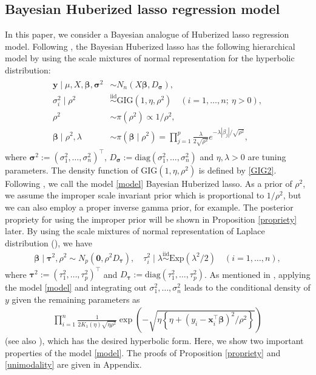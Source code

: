 \documentclass[11pt]{article}
\theoremstyle{plain}
\theoremstyle{definition}
\begin{document}
\subsection{Bayesian Huberized lasso regression model}
\label{subsec:2.2}

In this paper, we consider a Bayesian analogue of Huberized lasso regression model. Following \cite{PC08}, the Bayesian Huberized lasso has the following hierarchical model by using the scale mixtures of normal representation for the hyperbolic distribution:
\begin{align}\label{model}
\begin{split}
\bm{y} \mid \mu,X,\bm{\beta},\bm{\sigma}^2 & \sim N_n(X\bm{\beta}, D_{\bm{\sigma}}),\\
\sigma_i^2 \mid \rho^2 & \overset{\mathrm{iid}}{\sim} \mathrm{GIG}(1,\eta,\rho^2)\quad (i=1,\dots,n; \  \eta>0),\\
\rho^2 & \sim \pi(\rho^2)\propto 1/\rho^2,\\
\bm{\beta} \mid \rho^2, \lambda &\sim \pi(\bm{\beta} \mid \rho^2) =\prod_{j=1}^p \frac{\lambda}{2\sqrt{\rho^2}}e^{-\lambda|\beta_j|/\sqrt{\rho^2}},
\end{split}
\end{align}
where $\bm{\sigma}^2:=(\sigma_1^2,\dots, \sigma_n^2)^{\top}$, $D_{\bm{\sigma}}:=\mathrm{diag}(\sigma_1^2,\dots,\sigma_n^2)$ and $\eta,\lambda>0$ are tuning parameters. The density function of $\mathrm{GIG}(1,\eta,\rho^2)$ is defined by \eqref{GIG2}. Following \cite{PC08}, we call the model \eqref{model} Bayesian Huberized lasso. As a prior of $\rho^2$, we assume the improper scale invariant prior which is proportional to $1/\rho^2$, but we can also employ a proper inverse gamma prior, for example. The posterior propriety for using the improper prior will be shown in Proposition \ref{propriety} later. By using the scale mixtures of normal representation of Laplace distribution (\cite{AM74}), we have
\begin{align}\label{Laplace}
\bm{\beta} \mid \bm{\tau}^2,\rho^2 \sim N_p(\bm{0},\rho^2 D_{\bm{\tau}}),\quad \tau_i^2 \mid \lambda \overset{\mathrm{iid}}{\sim} \mathrm{Exp}(\lambda^2/2) \quad (i=1,\dots,n),
\end{align}
where $\bm{\tau}^2:=(\tau_1^2,\dots,\tau_p^2)^{\top}$ and $D_{\bm{\tau}}:=\mathrm{diag}(\tau_1^2,\dots,\tau_p^2)$. 
As mentioned in \cite{PC08}, applying the model \eqref{model} and integrating out $\sigma_1^2,\dots,\sigma_n^2$ leads to the conditional density of $y$ given the remaining parameters as
\begin{align*}
\prod_{i=1}^n \frac{1}{2K_1(\eta)\sqrt{\eta \rho^2}} \exp\left(-\sqrt{\eta \left\{\eta+(y_i-\bm{x}_i^{\top}\bm{\beta})^2/\rho^2\right\}}\right)
\end{align*}
(see also \cite{G97}), which has the desired hyperbolic form. Here, we show two important properties of the model \eqref{model}. The proofs of Proposition \ref{propriety} and \ref{unimodality} are given in Appendix. 
\end{document}
